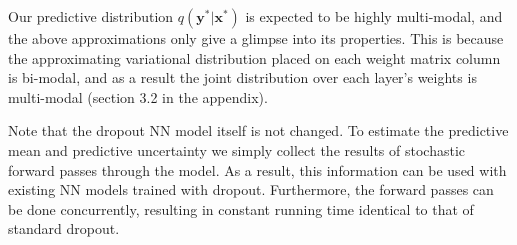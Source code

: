 \documentclass{article}
\newcommand{\x}{\mathbf{x}}
\newcommand{\y}{\mathbf{y}}
\theoremstyle{definition}
\begin{document}
Our predictive distribution $q(\y^* | \x^*)$ is expected to be highly multi-modal, and the above approximations only give a glimpse into its properties. This is because the approximating variational distribution placed on each weight matrix column is bi-modal, and as a result the joint distribution over each layer's weights is multi-modal (section 3.2 in the appendix).

Note that the dropout NN model itself is not changed. To estimate the predictive mean and predictive uncertainty we simply collect the results of stochastic forward passes through the model. As a result, this information can be used with existing NN models trained with dropout. Furthermore, the forward passes can be done concurrently, resulting in constant running time identical to that of standard dropout. %
\end{document}

